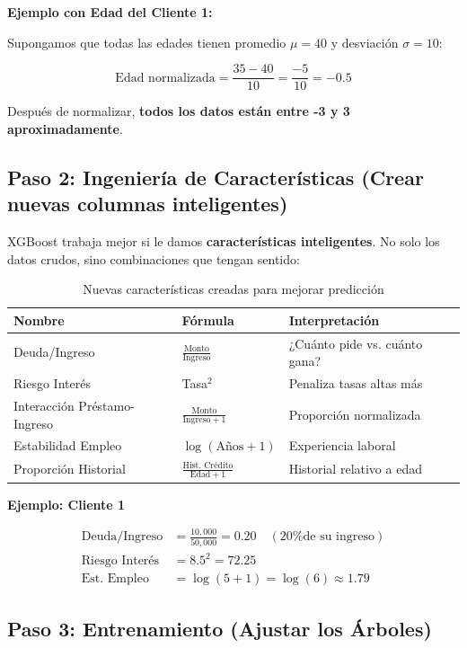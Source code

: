 \documentclass[11pt,a4paper,spanish]{article}
\begin{document}
\textbf{Ejemplo con Edad del Cliente 1:}

Supongamos que todas las edades tienen promedio $\mu = 40$ y desviación $\sigma = 10$:

\[
\text{Edad normalizada} = \frac{35 - 40}{10} = \frac{-5}{10} = -0.5
\]

Después de normalizar, \textbf{todos los datos están entre -3 y 3 aproximadamente}.

\subsection{Paso 2: Ingeniería de Características (Crear nuevas columnas inteligentes)}

XGBoost trabaja mejor si le damos \textbf{características inteligentes}. No solo los datos crudos, sino combinaciones que tengan sentido:

\begin{table}[H]
\centering
\begin{tabular}{|l|l|l|}
\hline
\textbf{Nombre} & \textbf{Fórmula} & \textbf{Interpretación} \\
\hline
Deuda/Ingreso & $\frac{\text{Monto}}{\text{Ingreso}}$ & ¿Cuánto pide vs. cuánto gana? \\
\hline
Riesgo Interés & Tasa$^2$ & Penaliza tasas altas más \\
\hline
Interacción Préstamo-Ingreso & $\frac{\text{Monto}}{\text{Ingreso} + 1}$ & Proporción normalizada \\
\hline
Estabilidad Empleo & $\log(\text{Años} + 1)$ & Experiencia laboral \\
\hline
Proporción Historial & $\frac{\text{Hist. Crédito}}{\text{Edad} + 1}$ & Historial relativo a edad \\
\hline
\end{tabular}
\caption{Nuevas características creadas para mejorar predicción}
\end{table}

\textbf{Ejemplo: Cliente 1}

\begin{align*}
\text{Deuda/Ingreso} &= \frac{10,000}{50,000} = 0.20 \quad (\text{20\% de su ingreso})\\
\text{Riesgo Interés} &= 8.5^2 = 72.25\\
\text{Est. Empleo} &= \log(5 + 1) = \log(6) \approx 1.79
\end{align*}

\subsection{Paso 3: Entrenamiento (Ajustar los Árboles)}
\end{document}
